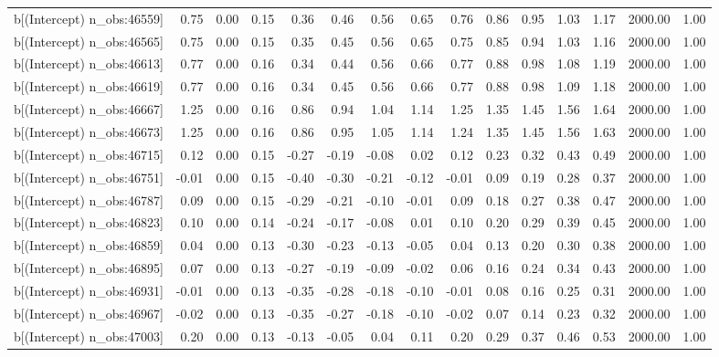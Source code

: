 \begin{table}[ht]
\begin{tabular}{rrrrrrrrrrrrrrr}
  b[(Intercept) n\_obs:46559] & 0.75 & 0.00 & 0.15 & 0.36 & 0.46 & 0.56 & 0.65 & 0.76 & 0.86 & 0.95 & 1.03 & 1.17 & 2000.00 & 1.00 \\ 
  b[(Intercept) n\_obs:46565] & 0.75 & 0.00 & 0.15 & 0.35 & 0.45 & 0.56 & 0.65 & 0.75 & 0.85 & 0.94 & 1.03 & 1.16 & 2000.00 & 1.00 \\ 
  b[(Intercept) n\_obs:46613] & 0.77 & 0.00 & 0.16 & 0.34 & 0.44 & 0.56 & 0.66 & 0.77 & 0.88 & 0.98 & 1.08 & 1.19 & 2000.00 & 1.00 \\ 
  b[(Intercept) n\_obs:46619] & 0.77 & 0.00 & 0.16 & 0.34 & 0.45 & 0.56 & 0.66 & 0.77 & 0.88 & 0.98 & 1.09 & 1.18 & 2000.00 & 1.00 \\ 
  b[(Intercept) n\_obs:46667] & 1.25 & 0.00 & 0.16 & 0.86 & 0.94 & 1.04 & 1.14 & 1.25 & 1.35 & 1.45 & 1.56 & 1.64 & 2000.00 & 1.00 \\ 
  b[(Intercept) n\_obs:46673] & 1.25 & 0.00 & 0.16 & 0.86 & 0.95 & 1.05 & 1.14 & 1.24 & 1.35 & 1.45 & 1.56 & 1.63 & 2000.00 & 1.00 \\ 
  b[(Intercept) n\_obs:46715] & 0.12 & 0.00 & 0.15 & -0.27 & -0.19 & -0.08 & 0.02 & 0.12 & 0.23 & 0.32 & 0.43 & 0.49 & 2000.00 & 1.00 \\ 
  b[(Intercept) n\_obs:46751] & -0.01 & 0.00 & 0.15 & -0.40 & -0.30 & -0.21 & -0.12 & -0.01 & 0.09 & 0.19 & 0.28 & 0.37 & 2000.00 & 1.00 \\ 
  b[(Intercept) n\_obs:46787] & 0.09 & 0.00 & 0.15 & -0.29 & -0.21 & -0.10 & -0.01 & 0.09 & 0.18 & 0.27 & 0.38 & 0.47 & 2000.00 & 1.00 \\ 
  b[(Intercept) n\_obs:46823] & 0.10 & 0.00 & 0.14 & -0.24 & -0.17 & -0.08 & 0.01 & 0.10 & 0.20 & 0.29 & 0.39 & 0.45 & 2000.00 & 1.00 \\ 
  b[(Intercept) n\_obs:46859] & 0.04 & 0.00 & 0.13 & -0.30 & -0.23 & -0.13 & -0.05 & 0.04 & 0.13 & 0.20 & 0.30 & 0.38 & 2000.00 & 1.00 \\ 
  b[(Intercept) n\_obs:46895] & 0.07 & 0.00 & 0.13 & -0.27 & -0.19 & -0.09 & -0.02 & 0.06 & 0.16 & 0.24 & 0.34 & 0.43 & 2000.00 & 1.00 \\ 
  b[(Intercept) n\_obs:46931] & -0.01 & 0.00 & 0.13 & -0.35 & -0.28 & -0.18 & -0.10 & -0.01 & 0.08 & 0.16 & 0.25 & 0.31 & 2000.00 & 1.00 \\ 
  b[(Intercept) n\_obs:46967] & -0.02 & 0.00 & 0.13 & -0.35 & -0.27 & -0.18 & -0.10 & -0.02 & 0.07 & 0.14 & 0.23 & 0.32 & 2000.00 & 1.00 \\ 
  b[(Intercept) n\_obs:47003] & 0.20 & 0.00 & 0.13 & -0.13 & -0.05 & 0.04 & 0.11 & 0.20 & 0.29 & 0.37 & 0.46 & 0.53 & 2000.00 & 1.00 \\ 

\end{tabular}
\end{table}
